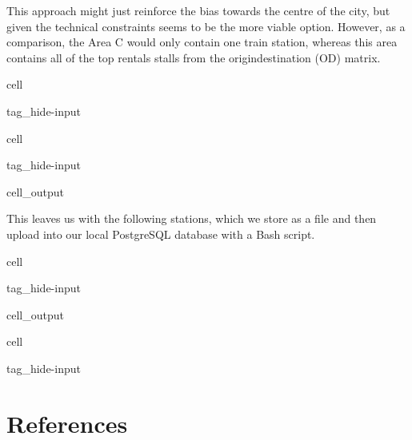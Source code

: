 \documentclass[letterpaper,10pt,english]{jupyterBook}
\begin{document}
\sphinxAtStartPar
This approach might just reinforce the bias towards the centre of the city, but given the technical constraints seems to be the more viable option. However, as a comparison, the Area C would only contain one train station, whereas this area contains all of the top rentals stalls from the origin\sphinxhyphen{}destination (OD) matrix.

\begin{sphinxuseclass}{cell}
\begin{sphinxuseclass}{tag_hide-input}
\end{sphinxuseclass}
\end{sphinxuseclass}
\begin{sphinxuseclass}{cell}
\begin{sphinxuseclass}{tag_hide-input}
\begin{sphinxuseclass}{cell_output}
\noindent{}

\end{sphinxuseclass}
\end{sphinxuseclass}
\end{sphinxuseclass}
\sphinxAtStartPar
This leaves us with the following stations, which we store as a  file and then upload into our local PostgreSQL database with a Bash script.

\begin{sphinxuseclass}{cell}
\begin{sphinxuseclass}{tag_hide-input}
\begin{sphinxuseclass}{cell_output}
\noindent{}

\end{sphinxuseclass}
\end{sphinxuseclass}
\end{sphinxuseclass}
\begin{sphinxuseclass}{cell}
\begin{sphinxuseclass}{tag_hide-input}
\end{sphinxuseclass}
\end{sphinxuseclass}

\section{References}
\label{\detokenize{03-data_ingestion_and_spatial_operations:references}}
\end{document}
